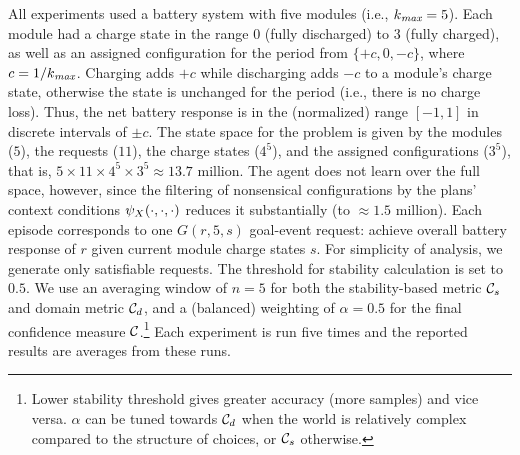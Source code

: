 All experiments used a battery system with five modules (i.e., $k_{\operatorname{\textit{max}}}=5$). 
%
Each module had a charge state in the range $0$ (fully discharged) to $3$ (fully charged), as well as an assigned configuration for the period from $\{+c, 0, -c\}$, where $c=1/k_{\operatorname{\textit{max}}}$.
%
%
Charging adds $+c$ while discharging adds $-c$ to a module's charge state, otherwise the state is unchanged for the period (i.e., there is no charge loss). Thus, the net battery response is in the (normalized) range $[-1,1]$ in discrete intervals of $\pm c$. The state space for the problem is given by the modules ($5$), the requests ($11$), the charge states ($4^5$), and the assigned configurations ($3^5$), that is, $5 \times 11 \times 4^5 \times 3^5 \approx 13.7$ million. The agent does not learn over the full space, however, since the filtering of nonsensical configurations by the plans' context conditions $\psi_X(\cdot,\cdot,\cdot)$ reduces it substantially (to $\approx1.5$ million).
%
Each episode corresponds to one $G(r,5,s)$ goal-event request: achieve overall battery response of $r$ given current module charge states $s$.  For simplicity of analysis, we generate only satisfiable requests.
The threshold for stability calculation is set to $0.5$. We use an averaging window of $n=5$ for both the stability-based metric ${\mathcal{C}}_s$ and domain metric ${\mathcal{C}}_d$, and a (balanced) weighting of $\alpha=0.5$ for the final confidence measure ${\mathcal{C}}$.\footnote{Lower stability threshold gives greater accuracy (more samples) and vice versa. 
$\alpha$ can be tuned towards ${\mathcal{C}}_d$ when the world is relatively complex compared to the structure of choices, or ${\mathcal{C}}_s$ otherwise.
} Each experiment is run five times and the reported results are averages from these runs. 
%
